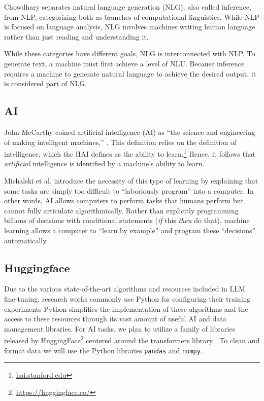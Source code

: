 Chowdhary separates natural language generation (NLG), also called inference, from NLP, categorizing both as branches of computational linguistics. While NLP is focused on language analysis, NLG involves machines writing human language rather than just reading and understanding it.

While these categories have different goals, NLG is interconnected with NLP. To generate text, a machine must first achieve a level of NLU. Because inference requires a machine to generate natural language to achieve the desired output, it is considered part of NLG.

\subsection{AI}
John McCarthy coined artificial intelligence (AI) as ``the science and engineering of making intelligent machines,'' \cite{andersen2002}. This definition relies on the definition of intelligence, which the HAI defines as the ability to learn.\footnote{\href{https://hai.stanford.edu/sites/default/files/2020-09/AI-Definitions-HAI.pdf}{hai.stanford.edu}} Hence, it follows that \textit{artificial} intelligence is identified by a machine's ability to learn.

Michalski et al. \cite{michalski2014} introduce the necessity of this type of learning by explaining that some tasks are simply too difficult to ``laboriously program'' into a computer. In other words, AI allows computers to perform tasks that humans perform but cannot fully articulate algorithmically. Rather than explicitly programming billions of decisions with conditional statements (\textit{if} this \textit{then} do that), machine learning allows a computer to ``learn by example'' and program these ``decisions'' automatically.

\subsection{Huggingface}
Due to the various state-of-the-art algorithms and resources included in LLM fine-tuning, research works commonly use Python for configuring their training experiments Python simplifies the implementation of these algorithms and the access to these resources through its vast amount of useful AI and data management libraries. For AI tasks, we plan to utilize a family of libraries released by HuggingFace\footnote{\url{https://huggingface.co/}} centered around the transformers library \cite{wolf2020}. To clean and format data we will use the Python libraries \lstinline{pandas} and \lstinline{numpy}.

